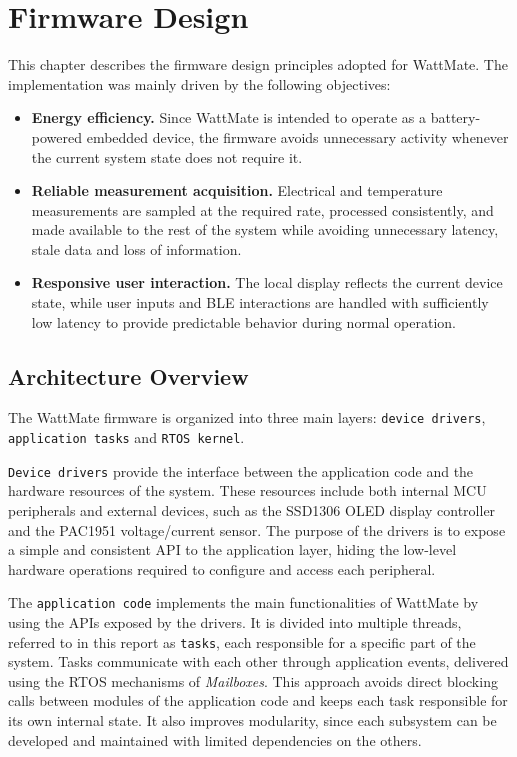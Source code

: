 \chapter{Firmware Design}
This chapter describes the firmware design principles adopted for WattMate. The implementation was mainly driven by the following objectives:

\begin{itemize}
	\item \textbf{Energy efficiency.}
	Since WattMate is intended to operate as a battery-powered embedded device, the firmware avoids unnecessary activity whenever the current system state does not require it.
	
	\item \textbf{Reliable measurement acquisition.}
	Electrical and temperature measurements are sampled at the required rate, processed consistently, and made available to the rest of the system while avoiding unnecessary latency, stale data and loss of information.
	
	\item \textbf{Responsive user interaction.}
	The local display reflects the current device state, while user inputs and BLE interactions are handled with sufficiently low latency to provide predictable behavior during normal operation.
\end{itemize}


\section{Architecture Overview}

The WattMate firmware is organized into three main layers: \texttt{device drivers}, \texttt{application tasks} and \texttt{RTOS kernel}.

\texttt{Device drivers} provide the interface between the application code and the hardware resources of the system. These resources include both internal MCU peripherals and external devices, such as the SSD1306 OLED display controller and the PAC1951 voltage/current sensor. The purpose of the drivers is to expose a simple and consistent API to the application layer, hiding the low-level hardware operations required to configure and access each peripheral.

The \texttt{application code} implements the main functionalities of WattMate by using the APIs exposed by the drivers. It is divided into multiple threads, referred to in this report as \texttt{tasks}, each responsible for a specific part of the system. Tasks communicate with each other through application events, delivered using the RTOS mechanisms of \textit{Mailboxes}. This approach avoids direct blocking calls between modules of the application code and keeps each task responsible for its own internal state. It also improves modularity, since each subsystem can be developed and maintained with limited dependencies on the others.

